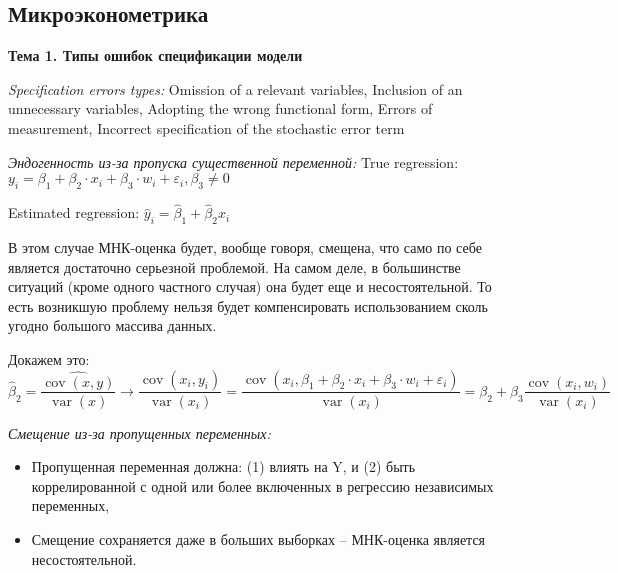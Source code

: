 \documentclass[a4paper,8pt]{article} %
\begin{document}
	

\subsection*{Микроэконометрика}

\textbf{Тема 1. Типы ошибок спецификации модели}

\textit{Specification errors types:}
Omission of a relevant variables, Inclusion of an unnecessary variables, Adopting the wrong functional form, Errors of measurement, Incorrect specification of the stochastic error term



\textit{Эндогенность из-за пропуска существенной
переменной: 
}
True regression: $
y_{i}=\beta_{1}+\beta_{2} \cdot x_{i}+\beta_{3} \cdot w_{i}+\varepsilon_{i}, \beta_{3} \neq 0
$

Estimated regression: $\hat{y}_{i}=\hat{\beta}_{1}+\hat{\beta}_{2} x_{i}$

В этом случае МНК-оценка будет, вообще говоря, смещена, что само по себе является достаточно серьезной проблемой. На самом деле, в большинстве ситуаций (кроме одного частного случая) она будет еще и несостоятельной. То есть возникшую проблему нельзя будет компенсировать использованием сколь угодно большого массива данных. 

Докажем это:
$$
\hat{\beta}_{2}=\frac{\widehat{\operatorname{cov}(x, y)}}{\widehat{\operatorname{var}}(x)} \rightarrow \frac{\operatorname{cov}\left(x_{i}, y_{i}\right)}{\operatorname{var}\left(x_{i}\right)}=\frac{\operatorname{cov}\left(x_{i}, \beta_{1}+\beta_{2} \cdot x_{i}+\beta_{3} \cdot w_{i}+\varepsilon_{i}\right)}{\operatorname{var}\left(x_{i}\right)}=
\beta_{2}+\beta_{3} \frac{\operatorname{cov}\left(x_{i}, w_{i}\right)}{\operatorname{var}\left(x_{i}\right)}$$


\textit{Смещение из-за пропущенных переменных:
}

\begin{itemize}
	\item Пропущенная переменная должна: (1) влиять
на Y, и  (2) быть коррелированной с одной или более
включенных в регрессию независимых переменных,
\item  Смещение сохраняется даже в больших выборках --  МНК-оценка является несостоятельной.
\end{itemize}
\end{document}
